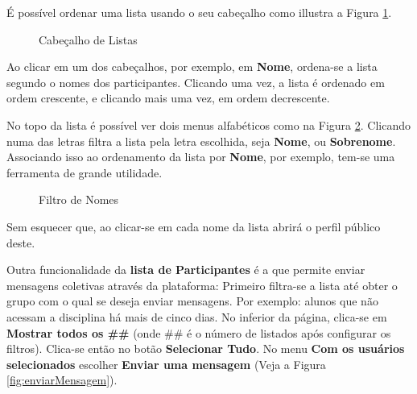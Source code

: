 É possível ordenar uma lista usando o seu cabeçalho como illustra a Figura \ref{fig:cabecalhoLista}.

\begin{figure}[htbp]
 \begin{center}
  \caption{Cabeçalho de Listas}
  \label{fig:cabecalhoLista}
 \end{center}
\end{figure}

Ao clicar em um dos cabeçalhos, por exemplo, em \textbf{Nome}, ordena-se a lista segundo o nomes dos participantes. Clicando uma vez, a lista é ordenado em ordem crescente, e clicando mais uma vez, em ordem decrescente.

No topo da lista é possível ver dois menus alfabéticos como na Figura \ref{fig:filtroNomes}. Clicando numa das letras filtra a lista pela letra escolhida, seja \textbf{Nome}, ou \textbf{Sobrenome}. Associando isso ao ordenamento da lista por \textbf{Nome}, por exemplo, tem-se uma ferramenta de grande utilidade.

\begin{figure}[htbp]
 \begin{center}
  \caption{Filtro de Nomes}
  \label{fig:filtroNomes}
 \end{center}
\end{figure}

Sem esquecer que, ao clicar-se em cada nome da lista abrirá o perfil público deste.

Outra funcionalidade da \textbf{lista de Participantes} é a que permite enviar mensagens coletivas através da plataforma:
Primeiro filtra-se a lista até obter o grupo com o qual se deseja enviar mensagens. Por exemplo: alunos que não acessam a disciplina há mais de cinco dias.
No inferior da página, clica-se em \textbf{Mostrar todos os \#\#} (onde \#\# é o número de listados após configurar os filtros).
Clica-se então no botão \textbf{Selecionar Tudo}. No menu \textbf{Com os usuários selecionados} escolher \textbf{Enviar uma mensagem} (Veja a Figura \ref{fig:enviarMensagem}).


